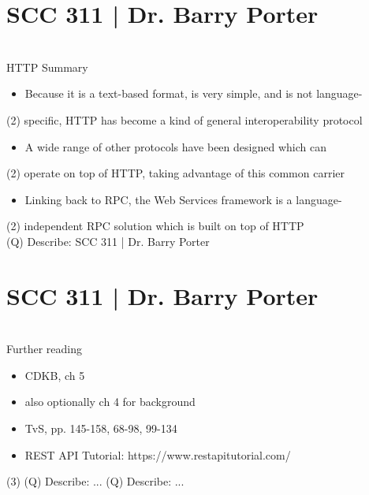 \documentclass[12pt]{article}
\begin{document}
\section{SCC 311 | Dr. Barry Porter}
\\
HTTP Summary\\
\begin{itemize}
  \item Because it is a text-based format, is very simple, and is not language-
\end{itemize}(2)
specific, HTTP has become a kind of general interoperability protocol\\
\begin{itemize}
  \item A wide range of other protocols have been designed which can 
\end{itemize}(2)
operate on top of HTTP, taking advantage of this common carrier\\
\begin{itemize}
  \item Linking back to RPC, the Web Services framework is a language-
\end{itemize}(2)
independent RPC solution which is built on top of HTTP\\
\clearpage
(Q)
Describe: SCC 311 | Dr. Barry Porter
\clearpage
\section{SCC 311 | Dr. Barry Porter}
\\
Further reading\\
\begin{itemize}
  \item CDKB, ch 5
  \item also optionally ch 4 for background
  \item TvS, pp. 145-158, 68-98, 99-134
  \item REST API Tutorial: https://www.restapitutorial.com/
\end{itemize}(3)
\clearpage
(Q)
Describe: ...
\clearpage
\clearpage
(Q)
Describe: ...
\clearpage
\\
\end{document}

